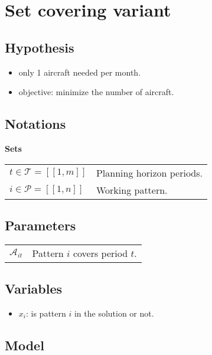 \documentclass[a4paper,11pt]{article}
\begin{document}
\section{Set covering variant}

    \subsection{Hypothesis}

    \begin{itemize}
     \item only 1 aircraft needed per month.
     \item objective: minimize the number of aircraft.
    \end{itemize}

    \subsection{Notations}

    \textbf{Sets}

    \begin{tabular}{ll}
    $t\in \mathcal{T} = [\![1, m]\!]$ & Planning horizon periods. \\
    $i \in \mathcal{P} = [\![1, n]\!]$ & Working pattern.\\
    \end{tabular}

    \vskip 0.3cm

    \subsection{Parameters}

    \begin{tabular}{ll}
        $\mathcal{A}_{it}$ & Pattern $i$ covers period $t$.\\
    \end{tabular}

    \vskip 0.3cm

    \subsection{Variables}

    \begin{itemize}
     \item $x_i$: is pattern $i$ in the solution or not.
    \end{itemize}

    \subsection{Model}
\end{document}
